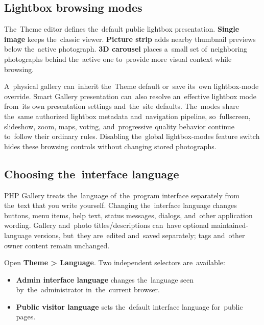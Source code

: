 \documentclass[11pt,a4paper]{article}
\newcommand{\ui}[1]{\textbf{#1}}
\begin{document}
\subsection{Lightbox browsing modes}

The~Theme editor defines the~default public lightbox presentation. \ui{Single
image} keeps the~classic viewer. \ui{Picture strip} adds nearby thumbnail
previews below the~active photograph. \ui{3D carousel} places a~small set
of~neighboring photographs behind the~active one to~provide more visual context
while browsing.

A~physical gallery can~inherit the~Theme default or~save its~own lightbox-mode
override. Smart Gallery presentation can~also resolve an~effective lightbox mode
from~its own presentation settings and~the~site defaults. The~modes share
the~same authorized lightbox metadata and~navigation pipeline, so~fullscreen,
slideshow, zoom, maps, voting, and~progressive quality behavior continue
to~follow their ordinary rules. Disabling the~global lightbox-modes feature
switch hides these browsing controls without changing stored photographs.

\subsection{Choosing the~interface language}
\label{sec:language-selection}

PHP Gallery treats the~language of~the~program interface separately from
the~text that you write yourself. Changing the~interface language changes
buttons, menu items, help text, status messages, dialogs, and~other application
wording. Gallery and~photo titles/descriptions can~have optional
maintained-language versions, but~they are~edited and~saved separately; tags
and~other owner content remain unchanged.

Open \ui{Theme > Language}. Two independent selectors are~available:

\begin{itemize}
  \item \ui{Admin interface language} changes the~language seen
  by~the~administrator in~the~current browser.
  \item \ui{Public visitor language} sets the~default interface language
  for~public pages.
\end{itemize}
\end{document}
